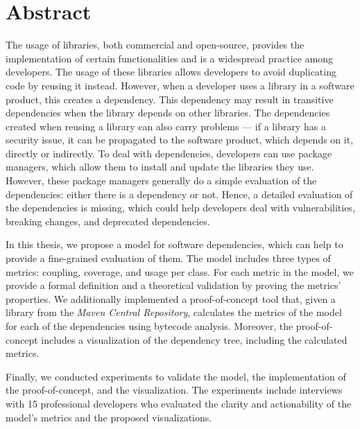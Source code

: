 \chapter*{Abstract}
The usage of libraries, both commercial and open-source, provides the implementation of certain functionalities and is a widespread practice among developers. The usage of these libraries allows developers to avoid duplicating code by reusing it instead. However, when a developer uses a library in a software product, this creates a dependency. This dependency may result in transitive dependencies when the library depends on other libraries. The dependencies created when reusing a library can also carry problems --- if a library has a security issue, it can be propagated to the software product, which depends on it, directly or indirectly. To deal with dependencies, developers can use package managers, which allow them to install and update the libraries they use. However, these package managers generally do a simple evaluation of the dependencies: either there is a dependency or not. Hence, a detailed evaluation of the dependencies is missing, which could help developers deal with vulnerabilities, breaking changes, and deprecated dependencies.

In this thesis, we propose a model for software dependencies, which can help to provide a fine-grained evaluation of them. The model includes three types of metrics: coupling, coverage, and usage per class. For each metric in the model, we provide a formal definition and a theoretical validation by proving the metrics' properties. We additionally implemented a proof-of-concept tool that, given a library from the \textit{Maven Central Repository}, calculates the metrics of the model for each of the dependencies using bytecode analysis. Moreover, the proof-of-concept includes a visualization of the dependency tree, including the calculated metrics.

Finally, we conducted experiments to validate the model, the implementation of the proof-of-concept, and the visualization. The experiments include interviews with 15 professional developers who evaluated the clarity and actionability of the model's metrics and the proposed visualizations.
